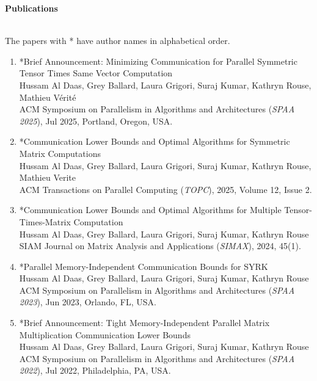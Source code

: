 \documentclass[letterpaper,11pt]{article}
\newcommand{\resheading}[1]{{\large \colorbox{mygrey}{\begin{minipage}{\textwidth}{\textbf{#1 \vphantom{p\^{E}}}}\end{minipage}}}}
\begin{document}
\vspace*{0.2in}
\resheading{Publications}
\vspace{0.005in} \\
{\scriptsize The papers with * have author names in alphabetical order.}
\begin{enumerate}
	\item *Brief Announcement: Minimizing Communication for Parallel Symmetric Tensor Times Same Vector Computation\\
	Hussam Al Daas, Grey Ballard, Laura Grigori, Suraj Kumar, Kathryn Rouse, Mathieu Vérité\\
	ACM Symposium on Parallelism in Algorithms and Architectures (\textit{SPAA 2025}), Jul 2025, Portland, Oregon, USA.
	
	\item *Communication Lower Bounds and Optimal Algorithms for Symmetric Matrix Computations\\
	Hussam Al Daas, Grey Ballard, Laura Grigori, Suraj Kumar, Kathryn Rouse, Mathieu Verite\\
	ACM Transactions on Parallel Computing (\textit{TOPC}), 2025, Volume 12, Issue 2.
	
	\item *Communication Lower Bounds and Optimal Algorithms for Multiple Tensor-Times-Matrix Computation\\
	Hussam Al Daas, Grey Ballard, Laura Grigori, Suraj Kumar, Kathryn Rouse\\
	SIAM Journal on Matrix Analysis and Applications (\textit{SIMAX}), 2024, 45(1).
	
	\item *Parallel Memory-Independent Communication Bounds for SYRK\\
	Hussam Al Daas, Grey Ballard, Laura Grigori, Suraj Kumar, Kathryn Rouse\\
	ACM Symposium on Parallelism in Algorithms and Architectures (\textit{SPAA 2023}), Jun 2023, Orlando, FL, USA.
	
%	
	\item *Brief Announcement: Tight Memory-Independent Parallel Matrix Multiplication Communication Lower Bounds\\
	Hussam Al Daas, Grey Ballard, Laura Grigori, Suraj Kumar, Kathryn Rouse\\
	ACM Symposium on Parallelism in Algorithms and Architectures (\textit{SPAA 2022}), Jul 2022, Philadelphia, PA, USA.
	

\end{enumerate}
\end{document}
